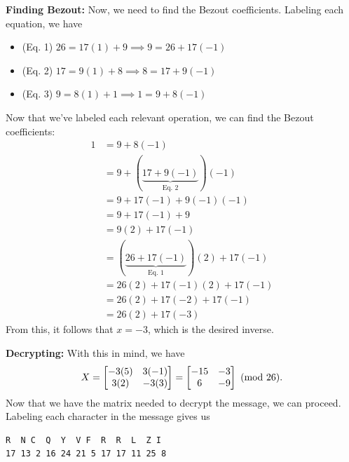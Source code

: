 \documentclass[letterpaper]{article}
\newcommand{\0}{\mathbf{0}}
\begin{document}
\begin{mdframed}
\begin{mdframed}
        \textbf{Finding Bezout:} Now, we need to find the Bezout coefficients. Labeling each equation, we have 
        \begin{itemize}
            \item (Eq. 1) $26 = 17(1) + 9 \implies 9 = 26 + 17(-1)$ 
            \item (Eq. 2) $17 = 9(1) + 8 \implies 8 = 17 + 9(-1)$
            \item (Eq. 3) $9 = 8(1) + 1 \implies 1 = 9 + 8(-1)$ 
        \end{itemize}
        Now that we've labeled each relevant operation, we can find the Bezout coefficients: 
        \begin{equation*}
            \begin{aligned}
                1 &= 9 + 8(-1) \\ 
                    &= 9 + (\underbrace{17 + 9(-1)}_{\text{Eq. 2}})(-1) \\ 
                    &= 9 + 17(-1) + 9(-1)(-1) \\ 
                    &= 9 + 17(-1) + 9 \\ 
                    &= 9(2) + 17(-1) \\ 
                    &= (\underbrace{26 + 17(-1)}_{\text{Eq. 1}})(2) + 17(-1) \\ 
                    &= 26(2) + 17(-1)(2) + 17(-1) \\ 
                    &= 26(2) + 17(-2) + 17(-1) \\ 
                    &= 26(2) + 17(-3)
            \end{aligned}
        \end{equation*}
        From this, it follows that $x = -3$, which is the desired inverse.  

        \bigskip 

        \textbf{Decrypting:} With this in mind, we have 
        \[X = \begin{bmatrix}
            -3(5) & 3(-1) \\ 3(2) & -3(3)
        \end{bmatrix} = \begin{bmatrix}
            -15 & -3 \\ 6 & -9
        \end{bmatrix} \ (\mathrm{mod}\ 26).\]
        Now that we have the matrix needed to decrypt the message, we can proceed. Labeling each character in the message gives us 
        \begin{mdframed}
            \begin{verbatim}
R  N C  Q  Y  V F  R  R  L  Z I
17 13 2 16 24 21 5 17 17 11 25 8\end{verbatim}
        \end{mdframed}
    \end{mdframed}


\end{mdframed}
\end{document}
